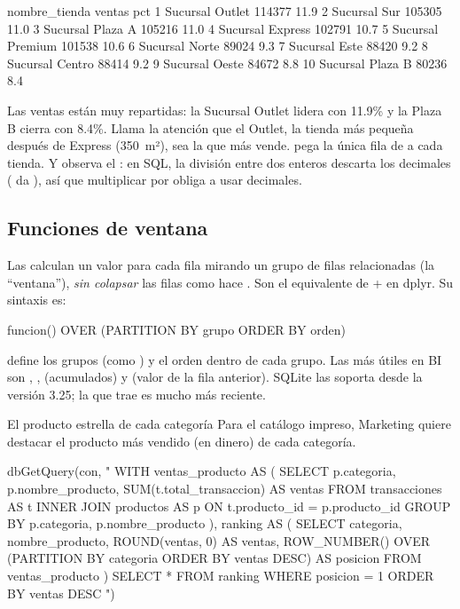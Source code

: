\begin{rsalida}
      nombre_tienda ventas  pct
1   Sucursal Outlet 114377 11.9
2      Sucursal Sur 105305 11.0
3  Sucursal Plaza A 105216 11.0
4  Sucursal Express 102791 10.7
5  Sucursal Premium 101538 10.6
6    Sucursal Norte  89024  9.3
7     Sucursal Este  88420  9.2
8   Sucursal Centro  88414  9.2
9    Sucursal Oeste  84672  8.8
10 Sucursal Plaza B  80236  8.4
\end{rsalida}

Las ventas están muy repartidas: la Sucursal Outlet lidera con 11.9\% y la
Plaza B cierra con 8.4\%. Llama la atención que el Outlet, la tienda más
pequeña después de Express (350~m²), sea la que más vende.  pega la única fila de
 a cada tienda. Y observa el : en SQL, la
división entre dos enteros descarta los decimales ( da
), así que multiplicar por  obliga a usar decimales.

\subsection{Funciones de ventana}
\label{sec:m5-ventanas}

Las  calculan un valor para cada fila
mirando un grupo de filas relacionadas (la ``ventana''), \emph{sin colapsar}
las filas como hace . Son el equivalente de
 +  en dplyr. Su sintaxis es:

\begin{sqlcode}
funcion() OVER (PARTITION BY grupo ORDER BY orden)
\end{sqlcode}

 define los grupos (como ) y
 el orden dentro de cada grupo. Las más útiles en BI son
, ,  (acumulados) y
 (valor de la fila anterior). SQLite las soporta desde la
versión 3.25; la que trae  es mucho más reciente.

\begin{ejemplo}{El producto estrella de cada categoría}
Para el catálogo impreso, Marketing quiere destacar el producto más vendido
(en dinero) de cada categoría.
\end{ejemplo}

\begin{rcode}
dbGetQuery(con, "
  WITH ventas_producto AS (
    SELECT p.categoria, p.nombre_producto,
           SUM(t.total_transaccion) AS ventas
    FROM transacciones AS t
    INNER JOIN productos AS p ON t.producto_id = p.producto_id
    GROUP BY p.categoria, p.nombre_producto
  ),
  ranking AS (
    SELECT categoria, nombre_producto, ROUND(ventas, 0) AS ventas,
           ROW_NUMBER() OVER (PARTITION BY categoria
                              ORDER BY ventas DESC) AS posicion
    FROM ventas_producto
  )
  SELECT * FROM ranking
  WHERE posicion = 1
  ORDER BY ventas DESC
")
\end{rcode}

